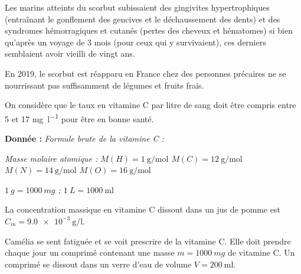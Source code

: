 \medskip
Les marins atteints du scorbut subissaient des gingivites hypertrophiques (entraînant le gonflement des gencives et le déchaussement des dents) et des syndromes hémorragiques et cutanés (pertes des cheveux et hématomes) si bien qu’après un voyage de 3 mois (pour ceux qui y survivaient), ces derniers semblaient avoir vieilli de vingt ans. 

\medskip
En 2019, le scorbut est réapparu en France chez des personnes précaires ne se nourrissant pas suffisamment de légumes et fruits frais.

\medskip
On considère que le taux en vitamine C par litre de sang doit être compris entre \num{5}  et \num{17}  \unit{\mg\per\litre} pour être en bonne santé.

\medskip
\textbf{Donnée : } 
\textit{Formule brute de la vitamine C :} 

\textit{Masse molaire atomique : $M(H) = \qty{1} {\g\per\mole}$ $M(C) = \qty{12} {\g\per\mole}$ $M(N) = \qty{14} {\g\per\mole}$ $M(O) = \qty{16} {\g\per\mole}$}

\textit{ $\qty{1} {g} = \qty{1 000} {mg}$   ;  $\qty{1} {L} = \qty{1 000} {\ml}$ }

\bigskip
{}

La concentration massique en vitamine C dissout dans un jus de pomme est $C_m = \qty{9,0e-3}{\g\per\litre}$.






\medskip
Camélia se sent fatiguée et se voit prescrire de la vitamine C. Elle doit prendre chaque jour un comprimé contenant une masse $m= \qty{1 000} {mg}$ de vitamine C. 
Un comprimé se dissout dans un verre d’eau de volume $V= \qty{200} {\ml}$.


